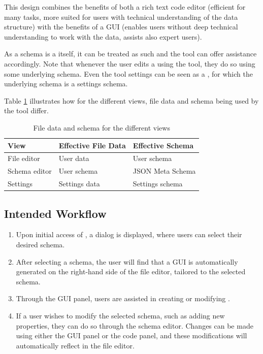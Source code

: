 This design combines the benefits of both a rich text code editor (efficient for many tasks, more suited for users with technical understanding of the data structure) with the benefits of a GUI (enables users without deep technical understanding to work with the data, assists also expert users).

As a schema is a \cfgfile{} itself, it can be treated as such and the tool can offer assistance accordingly.
Note that whenever the user edits a \cfgfile{} using the tool, they do so using some underlying schema.
Even the tool settings can be seen as a \cfgfile{}, for which the underlying schema is a settings schema.

Table \ref{tab:schema_and_file_data_by_mode} illustrates how for the different views, file data and schema being used by the tool differ.
\begin{table}[!t]
\caption{File data and schema for the different views}
\label{tab:schema_and_file_data_by_mode}
\centering
\begin{tabular}{lll}
\toprule
\textbf{View} & \textbf{Effective File Data} & \textbf{Effective Schema} \\
\midrule
File editor   & User data                    & User schema               \\
Schema editor & User schema                  & JSON Meta Schema          \\
Settings      & Settings data                & Settings schema           \\
\bottomrule
\end{tabular}
\end{table}


\subsection{Intended Workflow}\label{subsec:workflow} %
\begin{enumerate}
    \item Upon initial access of \toolname{}, a dialog is displayed, where users can select their desired schema.
    \item After selecting a schema, the user will find that a GUI is automatically generated on the right-hand side of the file editor,
    tailored to the selected schema.
    \item Through the GUI panel, users are assisted in creating or modifying \cfgfiles{}.
    \item If a user wishes to modify the selected schema, such as adding new properties, they can do so through the schema editor.
    Changes can be made using either the GUI panel or the code panel, and these modifications will automatically reflect in the file editor.
\end{enumerate}

